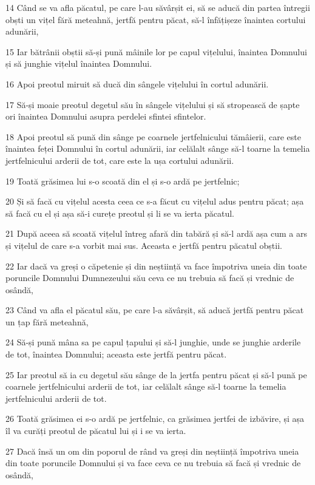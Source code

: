 \par 14 Când se va afla păcatul, pe care l-au săvârșit ei, să se aducă din partea întregii obști un vițel fără meteahnă, jertfă pentru păcat, să-l înfățișeze înaintea cortului adunării,
\par 15 Iar bătrânii obștii să-și pună mâinile lor pe capul vițelului, înaintea Domnului și să junghie vițelul înaintea Domnului.
\par 16 Apoi preotul miruit să ducă din sângele vițelului în cortul adunării.
\par 17 Să-și moaie preotul degetul său în sângele vițelului și să stropească de șapte ori înaintea Domnului asupra perdelei sfintei sfintelor.
\par 18 Apoi preotul să pună din sânge pe coarnele jertfelnicului tămâierii, care este înaintea feței Domnului în cortul adunării, iar celălalt sânge să-l toarne la temelia jertfelnicului arderii de tot, care este la ușa cortului adunării.
\par 19 Toată grăsimea lui s-o scoată din el și s-o ardă pe jertfelnic;
\par 20 Și să facă cu vițelul acesta ceea ce s-a făcut cu vițelul adus pentru păcat; așa să facă cu el și așa să-i curețe preotul și li se va ierta păcatul.
\par 21 După aceea să scoată vițelul întreg afară din tabără și să-l ardă așa cum a ars și vițelul de care s-a vorbit mai sus. Aceasta e jertfă pentru păcatul obștii.
\par 22 Iar dacă va greși o căpetenie și din neștiință va face împotriva uneia din toate poruncile Domnului Dumnezeului său ceva ce nu trebuia să facă și vrednic de osândă,
\par 23 Când va afla el păcatul său, pe care l-a săvârșit, să aducă jertfă pentru păcat un țap fără meteahnă,
\par 24 Să-și pună mâna sa pe capul țapului și să-l junghie, unde se junghie arderile de tot, înaintea Domnului; aceasta este jertfă pentru păcat.
\par 25 Iar preotul să ia cu degetul său sânge de la jertfa pentru păcat și să-l pună pe coarnele jertfelnicului arderii de tot, iar celălalt sânge să-l toarne la temelia jertfelnicului arderii de tot.
\par 26 Toată grăsimea ei s-o ardă pe jertfelnic, ca grăsimea jertfei de izbăvire, și așa îl va curăți preotul de păcatul lui și i se va ierta.
\par 27 Dacă însă un om din poporul de rând va greși din neștiință împotriva uneia din toate poruncile Domnului și va face ceva ce nu trebuia să facă și vrednic de osândă,
